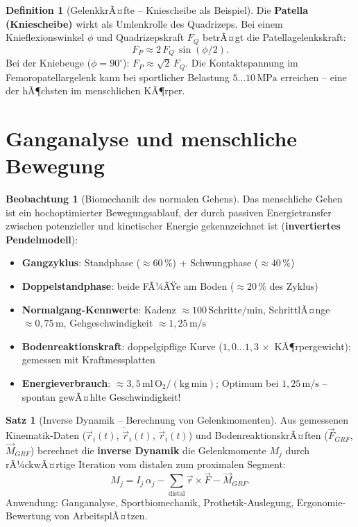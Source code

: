 ﻿\documentclass[a4paper,12pt]{report}
\theoremstyle{definition}
\newtheorem{definition}{Definition}
\newtheorem{satz}{Satz}
\newtheorem{beobachtung}{Beobachtung}
\begin{document}
\begin{definition}[GelenkkrÃ¤fte -- Kniescheibe als Beispiel]
Die \textbf{Patella (Kniescheibe)} wirkt als Umlenkrolle des Quadrizeps.
Bei einem Knieflexionswinkel $\phi$ und Quadrizepskraft $F_Q$ betrÃ¤gt
die Patellagelenkskraft:
\[
  F_P \approx 2\,F_Q\,\sin(\phi/2).
\]
Bei der Kniebeuge ($\phi = 90^\circ$): $F_P \approx \sqrt{2}\,F_Q$.
Die Kontaktspannung im Femoropatellargelenk kann bei sportlicher Belastung
$5\ldots10\,\mathrm{MPa}$ erreichen -- eine der hÃ¶chsten im menschlichen KÃ¶rper.
\end{definition}

\section{Ganganalyse und menschliche Bewegung}

\begin{beobachtung}[Biomechanik des normalen Gehens]
Das menschliche Gehen ist ein hochoptimierter Bewegungsablauf,
der durch passiven Energietransfer zwischen potenzieller und kinetischer
Energie gekennzeichnet ist (\textbf{invertiertes Pendelmodell}):
\begin{itemize}
    \item[-] \textbf{Gangzyklus}: Standphase ($\approx 60\,\%$) + Schwungphase ($\approx 40\,\%$)
    \item[-] \textbf{Doppelstandphase}: beide FÃ¼ÃŸe am Boden ($\approx 20\,\%$ des Zyklus)
    \item[-] \textbf{Normalgang-Kennwerte}: Kadenz $\approx 100\,\mathrm{Schritte/min}$,
          SchrittlÃ¤nge $\approx 0{,}75\,\mathrm{m}$, Gehgeschwindigkeit $\approx 1{,}25\,\mathrm{m/s}$
    \item[-] \textbf{Bodenreaktionskraft}: doppelgipflige Kurve ($1{,}0\ldots1{,}3\,\times$ KÃ¶rpergewicht);
          gemessen mit Kraftmessplatten
    \item[-] \textbf{Energieverbrauch}: $\approx 3{,}5\,\mathrm{ml\,O_2/(kg\,min)}$;
          Optimum bei $1{,}25\,\mathrm{m/s}$ -- spontan gewÃ¤hlte Geschwindigkeit!
\end{itemize}
\end{beobachtung}

\begin{satz}[Inverse Dynamik -- Berechnung von Gelenkmomenten]
Aus gemessenen Kinematik-Daten ($\vec{r}_i(t)$, $\dot{\vec{r}}_i(t)$, $\ddot{\vec{r}}_i(t)$)
und BodenreaktionskrÃ¤ften ($\vec{F}_{GRF}$, $\vec{M}_{GRF}$) berechnet die
\textbf{inverse Dynamik} die Gelenkmomente $M_j$ durch rÃ¼ckwÃ¤rtige Iteration
vom distalen zum proximalen Segment:
\[
  M_j = I_j\,\alpha_j - \sum_{\text{distal}}\vec{r}\times\vec{F} - \vec{M}_{GRF}.
\]
Anwendung: Ganganalyse, Sportbiomechanik, Prothetik-Auslegung,
Ergonomie-Bewertung von ArbeitsplÃ¤tzen.
\end{satz}
\end{document}
